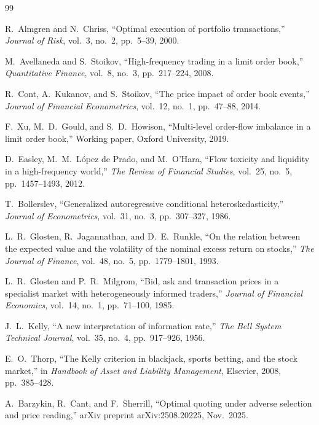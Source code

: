 \documentclass[11pt]{article}
\theoremstyle{definition}
\begin{document}
\begin{thebibliography}{99}

R.~Almgren and N.~Chriss,
``Optimal execution of portfolio transactions,''
\textit{Journal of Risk}, vol.~3, no.~2, pp.~5--39, 2000.

M.~Avellaneda and S.~Stoikov,
``High-frequency trading in a limit order book,''
\textit{Quantitative Finance}, vol.~8, no.~3, pp.~217--224, 2008.

R.~Cont, A.~Kukanov, and S.~Stoikov,
``The price impact of order book events,''
\textit{Journal of Financial Econometrics}, vol.~12, no.~1,
pp.~47--88, 2014.

F.~Xu, M.~D.~Gould, and S.~D.~Howison,
``Multi-level order-flow imbalance in a limit order book,''
Working paper, Oxford University, 2019.

D.~Easley, M.~M.~L\'opez de Prado, and M.~O'Hara,
``Flow toxicity and liquidity in a high-frequency world,''
\textit{The Review of Financial Studies}, vol.~25, no.~5,
pp.~1457--1493, 2012.

T.~Bollerslev,
``Generalized autoregressive conditional heteroskedasticity,''
\textit{Journal of Econometrics}, vol.~31, no.~3, pp.~307--327, 1986.

L.~R.~Glosten, R.~Jagannathan, and D.~E.~Runkle,
``On the relation between the expected value and the volatility of
the nominal excess return on stocks,''
\textit{The Journal of Finance}, vol.~48, no.~5, pp.~1779--1801, 1993.

L.~R.~Glosten and P.~R.~Milgrom,
``Bid, ask and transaction prices in a specialist market with
heterogeneously informed traders,''
\textit{Journal of Financial Economics}, vol.~14, no.~1,
pp.~71--100, 1985.

J.~L.~Kelly,
``A new interpretation of information rate,''
\textit{The Bell System Technical Journal}, vol.~35, no.~4,
pp.~917--926, 1956.

E.~O.~Thorp,
``The Kelly criterion in blackjack, sports betting, and the stock
market,''
in \textit{Handbook of Asset and Liability Management}, Elsevier,
2008, pp.~385--428.

A.~Barzykin, R.~Cant, and F.~Sherrill,
``Optimal quoting under adverse selection and price reading,''
arXiv preprint arXiv:2508.20225, Nov.~2025.


\end{thebibliography}
\end{document}

